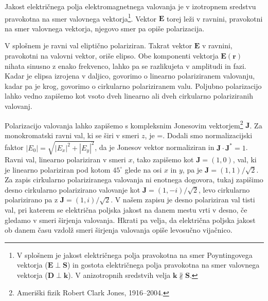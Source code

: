 Jakost električnega polja elektromagnetnega valovanja je v izotropnem
sredstvu pravokotna na smer valovnega vektorja\footnote{V splošnem je
jakost električnega polja pravokotna na smer Poyntingovega vektorja ($\mathbf{E}\perp\mathbf{S}$) in 
gostota električnega polja pravokotna na smer valovnega vektorja ($\mathbf{D}\perp\mathbf{k}$). 
V anizotropnih sredstvih velja $\mathbf k\nparallel\mathbf S$.}. Vektor $\mathbf{E}$
torej leži v ravnini, pravokotni na smer valovnega vektorja, njegovo
smer pa opiše polarizacija. 

V splošnem je ravni val eliptično polariziran. Takrat vektor $\mathbf E$
v ravnini, pravokotni na valovni vektor, oriše elipso. Obe komponenti vektorja 
$\mathbf{E}(\mathbf{r})$ nihata sinusno z enako frekvenco, lahko pa se razlikujeta
v amplitudi in fazi. Kadar je elipsa izrojena v daljico, govorimo o linearno polariziranem valovanju,
kadar pa je krog, govorimo o cirkularno polariziranem valu. Poljubno polarizacijo
lahko vedno zapišemo kot vsoto dveh linearno ali dveh cirkularno polariziranih
valovanj. 

Polarizacijo valovanja lahko zapišemo s kompleksnim Jonesovim 
vektorjem\footnote{Ameriški fizik Robert Clark Jones, 1916--2004.}
$\mathbf{J}$. Za monokromatski ravni val, ki se širi v smeri $z$, je 
\beq
{}=\left[\begin{array}{c}
E_{x}\\
E_{y}
\end{array}\right].
\eeq
Dodali smo normalizacijski faktor $|E_{0}|=\sqrt{|E_{x}|^{2}+|E_{y}|^{2}}$,
da je Jonesov vektor normaliziran in $\mathbf{J}\cdot\mathbf{J}^{*}=1$.
Ravni val, linearno polariziran v smeri $x$, tako zapišemo kot $\mathbf{J}=\left(1,0\right)$,
val, ki je linearno polariziran pod kotom $45^{\circ}$ glede na osi
$x$ in $y$, pa je $\mathbf{J}=\left(1,1\right)/\sqrt{2}$.
Za zapis cirkularno polariziranega valovanja ni enotnega dogovora, tukaj zapišimo
desno cirkularno polarizirano valovanje kot 
$\mathbf{J}=\left(1,-i\right)/\sqrt{2}$,
levo cirkularno polarizirano pa z $\mathbf{J}=\left(1,i\right)/\sqrt{2}$.
V našem zapisu je desno polariziran val tisti val, pri katerem se električna
poljska jakost na danem mestu vrti v desno, če gledamo v smeri širjenja
valovanja. Hkrati pa velja, da električna poljska jakost ob danem
času vzdolž smeri širjenja valovanja opiše levosučno vijačnico. 

